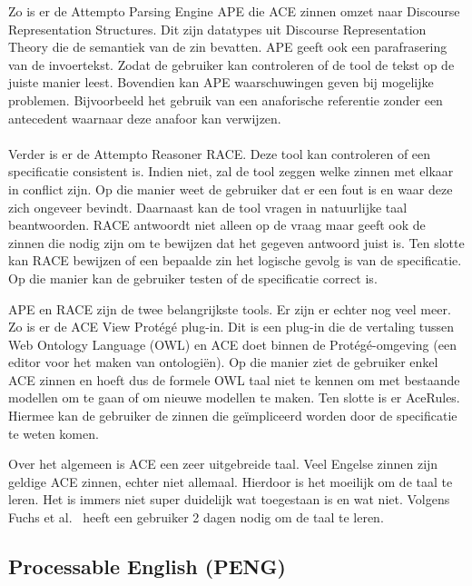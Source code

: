 Zo is er de Attempto Parsing Engine APE die ACE zinnen omzet naar Discourse Representation Structures. Dit zijn datatypes uit Discourse Representation Theory die de semantiek van de zin bevatten. APE geeft ook een parafrasering van de invoertekst. Zodat de gebruiker kan controleren of de tool de tekst op de juiste manier leest. Bovendien kan APE waarschuwingen geven bij mogelijke problemen. Bijvoorbeeld het gebruik van een anaforische referentie zonder een antecedent waarnaar deze anafoor kan verwijzen.

\paragraph{} Verder is er de Attempto Reasoner RACE. Deze tool kan controleren of een specificatie consistent is. Indien niet, zal de tool zeggen welke zinnen met elkaar in conflict zijn. Op die manier weet de gebruiker dat er een fout is en waar deze zich ongeveer bevindt. Daarnaast kan de tool vragen in natuurlijke taal beantwoorden. RACE antwoordt niet alleen op de vraag maar geeft ook de zinnen die nodig zijn om te bewijzen dat het gegeven antwoord juist is. Ten slotte kan RACE bewijzen of een bepaalde zin het logische gevolg is van de specificatie. Op die manier kan de gebruiker testen of de specificatie correct is.

APE en RACE zijn de twee belangrijkste tools. Er zijn er echter nog veel meer. Zo is er de ACE View Prot\'eg\'e plug-in. Dit is een plug-in die de vertaling tussen Web Ontology Language (OWL) en ACE doet binnen de Prot\'eg\'e-omgeving (een editor voor het maken van ontologi\"en). Op die manier ziet de gebruiker enkel ACE zinnen en hoeft dus de formele OWL taal niet te kennen om met bestaande modellen om te gaan of om nieuwe modellen te maken. Ten slotte is er AceRules. Hiermee kan de gebruiker de zinnen die ge\"impliceerd worden door de specificatie te weten komen.

Over het algemeen is ACE een zeer uitgebreide taal. Veel Engelse zinnen zijn geldige ACE zinnen, echter niet allemaal. Hierdoor is het moeilijk om de taal te leren. Het is immers niet super duidelijk wat toegestaan is en wat niet. Volgens Fuchs et al.\ \cite{Fuchs2008} heeft een gebruiker 2 dagen nodig om de taal te leren.

\subsection{Processable English (PENG)}
